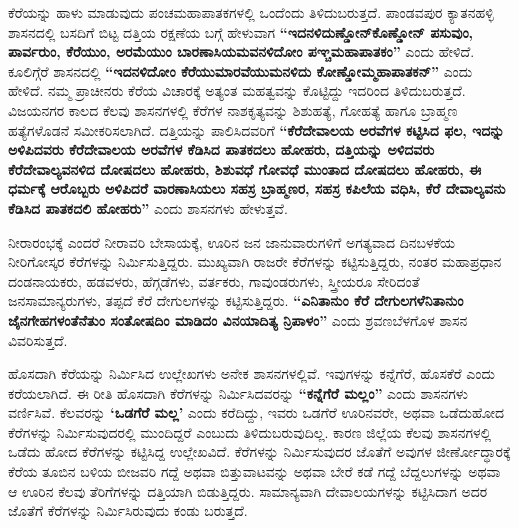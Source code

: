 ಕೆರೆಯನ್ನು ಹಾಳು ಮಾಡುವುದು ಪಂಚಮಹಾಪಾತಕಗಳಲ್ಲಿ ಒಂದೆಂದು ತಿಳಿದುಬರುತ್ತದೆ. ಪಾಂಡವಪುರ ಕ್ಯಾತನಹಳ್ಳಿ ಶಾಸನದಲ್ಲಿ ಬಸದಿಗೆ ಬಿಟ್ಟ ದತ್ತಿಯ ರಕ್ಷಣೆಯ ಬಗ್ಗೆ ಹೇಳುವಾಗ \textbf{“ಇದನಳಿದುಣ್ಡೋನ್​ ಕೊಣ್ಡೋನ್​ ಪಸುವುಂ, ಪಾರ್ವರುಂ, ಕೆರೆಯುಂ, ಅರಮೆಯುಂ ಬಾರಣಾಸಿಯಮವನಳಿದೋಂ ಪಞ್ಚಮಹಾಪಾತಕಂ”} ಎಂದು ಹೇಳಿದೆ. ಕೂಲಿಗ್ಗೆರೆ ಶಾಸನದಲ್ಲಿ \textbf{“ಇದನಳಿದೋಂ ಕೆರೆಯುಮಾರವೆಯುಮನಳಿದು ಕೋಣ್ಡೋಮ್ಮಹಾಪಾತಕನ್​”} ಎಂದು ಹೇಳಿದೆ. ನಮ್ಮ ಪ್ರಾಚೀನರು ಕೆರೆಯ ವಿಚಾರಕ್ಕೆ ಅತ್ಯಂತ ಮಹತ್ವವನ್ನು ಕೊಟ್ಟಿದ್ದು ಇದರಿಂದ ತಿಳಿದುಬರುತ್ತದೆ. ವಿಜಯನಗರ ಕಾಲದ ಕೆಲವು ಶಾಸನಗಳಲ್ಲಿ ಕೆರೆಗಳ ನಾಶಕೃತ್ಯವನ್ನು ಶಿಶುಹತ್ಯೆ, ಗೋಹತ್ಯೆ ಹಾಗೂ ಬ್ರಾಹ್ಮಣ ಹತ್ಯೆಗಳೊಡನೆ ಸಮೀಕರಿಸಲಾಗಿದೆ. ದತ್ತಿಯನ್ನು ಪಾಲಿಸಿದವರಿಗೆ \textbf{“ಕೆರೆದೇವಾಲಯ ಅರವೆಗಳ ಕಟ್ಟಿಸಿದ ಫಲ, ಇದನ್ನು ಅಳಿಪಿದವರು ಕೆರೆದೇವಾಲಯ ಅರವೆಗಳ ಕೆಡಿಸಿದ ಪಾತಕದಲು ಹೋಹರು, ದತ್ತಿಯನ್ನು ಅಳಿದವರು ಕೆರೆದೇವಾಲ್ಯವನಳಿದ ದೋಷದಲು ಹೋಹರು, ಶಿಶುವಧೆ ಗೋವಧೆ ಮುಂತಾದ ದೋಷದಲು ಹೋಹರು, ಈ ಧರ್ಮಕ್ಕೆ ಆರೊಬ್ಬರು ಅಳಿಪಿದರೆ ವಾರಣಾಸಿಯಲು ಸಹಸ್ರ ಬ್ರಾಹ್ಮಣರ, ಸಹಸ್ರ ಕಪಿಲೆಯ ವಧಿಸಿ, ಕೆರೆ ದೇವಾಲ್ಯವನು ಕೆಡಿಸಿದ ಪಾತಕದಲಿ ಹೋಹರು”} ಎಂದು ಶಾಸನಗಳು ಹೇಳುತ್ತವೆ.

ನೀರಾರಂಭಕ್ಕೆ ಎಂದರೆ ನೀರಾವರಿ ಬೇಸಾಯಕ್ಕೆ, ಊರಿನ ಜನ ಜಾನುವಾರುಗಳಿಗೆ ಅಗತ್ಯವಾದ ದಿನಬಳಕೆಯ ನೀರಿಗೋಸ್ಕರ ಕೆರೆಗಳನ್ನು ನಿರ್ಮಿಸುತ್ತಿದ್ದರು. ಮುಖ್ಯವಾಗಿ ರಾಜರೇ ಕೆರೆಗಳನ್ನು ಕಟ್ಟಿಸುತ್ತಿದ್ದರು, ನಂತರ ಮಹಾಪ್ರಧಾನ ದಂಡನಾಯಕರು, ಹಡವಳರು, ಹೆಗ್ಗಡೆಗಳು, ವರ್ತಕರು, ಗಾವುಂಡರುಗಳು, ಸ್ತ್ರೀಯರೂ ಸೇರಿದಂತೆ ಜನಸಾಮಾನ್ಯರುಗಳು, ತಪ್ಪದೆ ಕೆರೆ ದೇಗುಲಗಳನ್ನು ಕಟ್ಟಿಸುತ್ತಿದ್ದರು. \textbf{“ಎನಿತಾನುಂ ಕೆರೆ ದೇಗುಲಗಳೆನಿತಾನುಂ ಜೈನಗೇಹಗಳಂತೆನೆತುಂ ಸಂತೋಷದಿಂ ಮಾಡಿದಂ ವಿನಯಾದಿತ್ಯ ನ್ರಿಪಾಳಂ”} ಎಂದು ಶ್ರವಣಬೆಳಗೊಳ ಶಾಸನ ವಿವರಿಸುತ್ತದೆ.

ಹೊಸದಾಗಿ ಕೆರೆಯನ್ನು ನಿರ್ಮಿಸಿದ ಉಲ್ಲೇಖಗಳು ಅನೇಕ ಶಾಸನಗಳಲ್ಲಿವೆ. ಇವುಗಳನ್ನು ಕನ್ನೆಗೆರೆ, ಹೊಸಕೆರೆ ಎಂದು ಕರೆಯಲಾಗಿದೆ. ಈ ರೀತಿ ಹೊಸದಾಗಿ ಕೆರೆಗಳನ್ನು ನಿರ್ಮಿಸಿದವರನ್ನು \textbf{“ಕನ್ನೆಗೆರೆ ಮಲ್ಲಂ”} ಎಂದು ಶಾಸನಗಳು ವರ್ಣಿಸಿವೆ. ಕೆಲವರನ್ನು \textbf{‘ಒಡಗೆರೆ ಮಲ್ಲ’} ಎಂದು ಕರೆದಿದ್ದು, ಇವರು ಒಡಗೆರೆ ಊರಿನವರೇ, ಅಥವಾ ಒಡೆದುಹೋದ ಕೆರೆಗಳನ್ನು ನಿರ್ಮಿಸುವುದರಲ್ಲಿ ಮುಂದಿದ್ದರೆ ಎಂಬುದು ತಿಳಿದುಬರುವುದಿಲ್ಲ. ಕಾರಣ ಜಿಲ್ಲೆಯ ಕೆಲವು ಶಾಸನಗಳಲ್ಲಿ ಒಡೆದು ಹೋದ ಕೆರೆಗಳನ್ನು ಕಟ್ಟಿಸಿದ್ದ ಉಲ್ಲೇಖವಿದೆ. ಕೆರೆಗಳನ್ನು ನಿರ್ಮಿಸುವುದರ ಜೊತೆಗೆ ಅವುಗಳ ಜೀರ್ಣೋದ್ಧಾರಕ್ಕೆ ಕೆರೆಯ ತೂಬಿನ ಬಳಿಯ ಬೀಜವರಿ ಗದ್ದೆ ಅಥವಾ ಬಿತ್ತುವಾಟವನ್ನು ಅಥವಾ ಬೇರೆ ಕಡೆ ಗದ್ದೆ ಬೆದ್ದಲುಗಳನ್ನು ಅಥವಾ ಆ ಊರಿನ ಕೆಲವು ತೆರಿಗೆಗಳನ್ನು ದತ್ತಿಯಾಗಿ ಬಿಡುತ್ತಿದ್ದರು. ಸಾಮಾನ್ಯವಾಗಿ ದೇವಾಲಯಗಳನ್ನು ಕಟ್ಟಿಸಿದಾಗ ಅದರ ಜೊತೆಗೆ ಕೆರೆಗಳನ್ನು ನಿರ್ಮಿಸಿರುವುದು ಕಂಡು ಬರುತ್ತದೆ.

